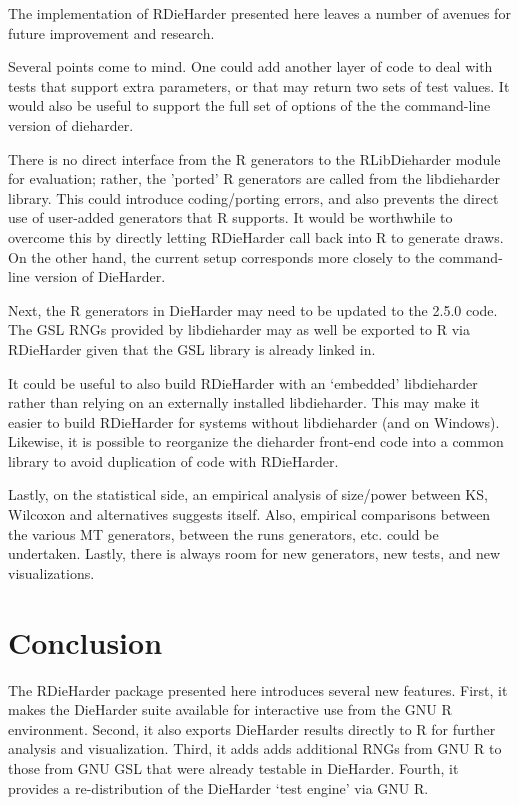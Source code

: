 \documentclass[12pt]{article}
\newcommand{\pkg}[1]{{\normalfont\fontseries{b}\selectfont #1}}
\begin{document}
The implementation of RDieHarder presented here leaves a number of avenues
for future improvement and research. 

Several points come to mind. One could add another layer of code to
deal with tests that support extra parameters, or that may return two
sets of test values. It would also be useful to support the full set of
options of the the command-line version of dieharder.  

There is no direct interface from the R generators to the RLibDieharder
module for evaluation; rather, the 'ported' R generators are called from the
libdieharder library. This could introduce coding/porting errors, and also
prevents the direct use of user-added generators that R supports. It would be
worthwhile to overcome this by directly letting \pkg{RDieHarder} call back
into R to generate draws. On the other hand, the current setup corresponds
more closely to the command-line version of DieHarder.

Next, the R generators in DieHarder may need to be updated to the 2.5.0
code. The GSL RNGs provided by libdieharder may as well be exported to R via
\pkg{RDieHarder} given that the GSL library is already linked in.

It could be useful to also build RDieHarder with an `embedded' libdieharder
rather than relying on an externally installed libdieharder. This may make
it easier to build RDieHarder for systems without libdieharder (and on
Windows).  Likewise, it is possible to reorganize the dieharder front-end
code into a common library to avoid duplication of code with RDieHarder.

Lastly, on the statistical side, an empirical analysis of size/power between
KS, Wilcoxon and alternatives suggests itself. Also, empirical comparisons
between the various MT generators, between the runs generators, etc.  could
be undertaken.  Lastly, there is always room for new generators, new tests,
and new visualizations.

\section{Conclusion}

The \pkg{RDieHarder} package presented here introduces several new features.
First, it makes the DieHarder suite \citep{Brown:dieharder:2007} available
for interactive use from the GNU R environment. Second, it also exports
DieHarder results directly to R for further analysis and visualization.
Third, it adds adds additional RNGs from GNU R to those from GNU GSL that
were already testable in DieHarder. Fourth, it provides a re-distribution of
the DieHarder `test engine' via GNU R.



\end{document}

